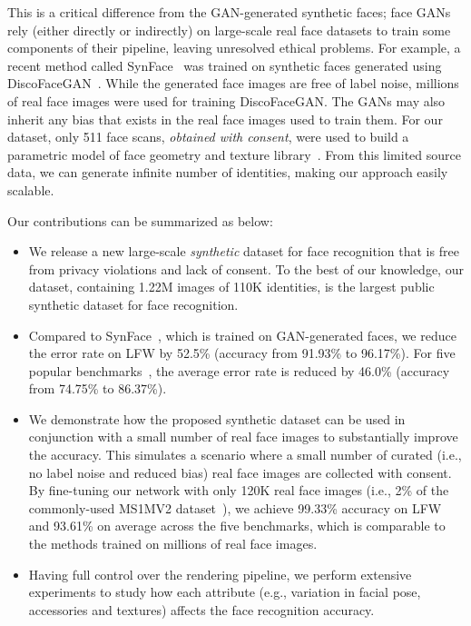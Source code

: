 \documentclass[10pt,twocolumn,letterpaper]{article}
\begin{document}
This is a critical difference from the GAN-generated synthetic faces; face GANs rely (either directly or indirectly) on large-scale real face datasets to train some components of their pipeline, leaving unresolved ethical problems. For example, a recent method called SynFace~\cite{2021_FR_synface} was trained on synthetic faces generated using DiscoFaceGAN~\cite{2020_discofacegan}. While the generated face images are free of label noise, millions of real face images were used for training DiscoFaceGAN. The GANs may also inherit any bias that exists in the real face images used to train them. For our dataset, only 511 face scans, \textit{obtained with consent}, were used to build a parametric model of face geometry and texture library~\cite{2021_FakeItMakeIt}. 
From this limited source data, we can generate infinite number of identities, making our approach easily scalable.

Our contributions can be summarized as below:

\begin{itemize}[leftmargin=*]
    \item We release a new large-scale \textit{synthetic} dataset for face recognition that is free from privacy violations and lack of consent. To the best of our knowledge, our dataset, containing 1.22M images of 110K identities, is the largest public synthetic dataset for face recognition.
    \item Compared to SynFace~\cite{2021_FR_synface}, which is trained on GAN-generated faces, we reduce the error rate on LFW by 52.5\% (accuracy from 91.93\% to 96.17\%). For five popular benchmarks~\cite{2008_FRD_LFW,2016_FRD_CFPFP,2018_FRD_CPLFW,2017_FRD_AGEDB,2017_FRD_CALFW}, the average error rate is reduced by 46.0\% (accuracy from 74.75\% to 86.37\%).
    \item We demonstrate how the proposed synthetic dataset can be used in conjunction with a small number of real face images to substantially improve the accuracy. This simulates a scenario where a small number of curated (i.e., no label noise and reduced bias) real face images are collected with consent. By fine-tuning our network with only 120K real face images (i.e., 2\% of the commonly-used MS1MV2 dataset~\cite{2019_FR_ArcFace}), we achieve 99.33\% accuracy on LFW and 93.61\% on average across the five benchmarks, which is comparable to the methods trained on millions of real face images.
    \item Having full control over the rendering pipeline, we perform extensive experiments to study how each attribute (e.g., variation in facial pose, accessories and textures) affects the face recognition accuracy. 
\end{itemize}
\end{document}
